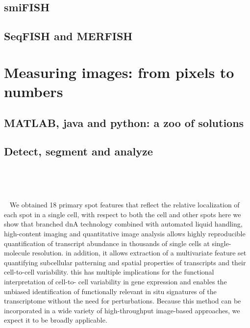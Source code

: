 \subsection{\ac{smiFISH}}

\subsection{\ac{SeqFISH} and \ac{MERFISH}}


\section{Measuring images: from pixels to numbers}


\subsection{MATLAB, java and python: a zoo of solutions}

\subsection{Detect, segment and analyze}

~\cite{shariff_automated_2010}
~\cite{laux_interactive_2020}
~\cite{das_intracellular_2021}

~\cite{mcquin_cellprofiler_2018}
~\cite{mueller_fish-quant_2013}
~\cite{de_chaumont_icy_2012}
~\cite{ershov_bringing_2021} %
~\cite{ljosa_introduction_2009}
~\cite{stoeger_computer_2015}
~\cite{perkel_starfish_2019}
~\cite{noauthor_mammalian_2020}
~\cite{eng_transcriptome-scale_2019}
~\cite{kamenova_co-translational_2019}
~\cite{liao_rna_2019}
~\cite{xia_spatial_2019}
~\cite{tsanov_smifish_2016}
~\cite{samacoits_computational_2018}
~\cite{battich_image-based_2013}
~\cite{savulescu_interrogating_2021}

~\cite{battich_image-based_2013}
We obtained 18 primary spot features that reflect the
relative localization of each spot in a single cell, with respect to both the cell and other spots
here we show that branched dnA technology combined with automated liquid handling, high-content imaging and quantitative image analysis allows highly reproducible quantification of transcript abundance in thousands of single cells at single-molecule resolution.
in addition, it allows extraction of a multivariate feature set quantifying subcellular patterning and spatial properties of transcripts and their cell-to-cell variability. this has multiple implications for the functional interpretation of cell-to-
cell variability in gene expression and enables the unbiased identification of functionally relevant in situ signatures
of the transcriptome without the need for perturbations. Because this method can be incorporated in a wide variety of high-throughput image-based approaches, we expect it to be broadly applicable.

